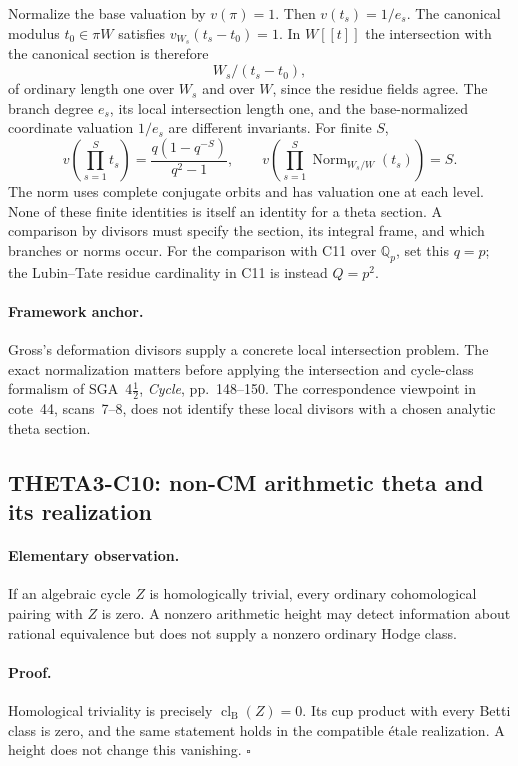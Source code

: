 \documentclass[11pt]{article}
\newcommand{\Q}{\mathbb Q}\newcommand{\C}{\mathbb C}\newcommand{\Z}{\mathbb Z}\newcommand{\R}{\mathbb R}\newcommand{\A}{\mathbb A}\newcommand{\OO}{\mathcal O}
\theoremstyle{definition}\newtheorem{definition}[theorem]{Definition}\newtheorem{remark}[theorem]{Remark}
\begin{document}
Normalize the base valuation by $v(\pi)=1$. Then
$v(t_s)=1/e_s$. The canonical modulus $t_0\in\pi W$ satisfies
$v_{W_s}(t_s-t_0)=1$. In $W[[t]]$ the intersection with the canonical
section is therefore
\[
 W_s/(t_s-t_0),
\]
of ordinary length one over $W_s$ and over $W$, since the residue
fields agree. The branch degree $e_s$, its local intersection
length one, and the base-normalized coordinate valuation $1/e_s$
are different invariants. For finite $S$,
\[
 v\left(\prod_{s=1}^St_s\right)
 =\frac{q(1-q^{-S})}{q^2-1},\qquad
 v\left(\prod_{s=1}^S
             \operatorname{Norm}_{W_s/W}(t_s)\right)=S.
\]
The norm uses complete conjugate orbits and has valuation one at
each level. None of these finite identities is itself an identity
for a theta section. A comparison by divisors must specify the
section, its integral frame, and which branches or norms occur.
For the comparison with C11 over $\Q_p$, set this $q=p$; the
Lubin--Tate residue cardinality in C11 is instead $Q=p^2$.

\paragraph{Framework anchor.}
Gross's deformation divisors supply a concrete local intersection problem.
The exact normalization matters before applying the intersection and
cycle-class formalism of SGA~4$\frac12$, \emph{Cycle}, pp.~148--150.
The correspondence viewpoint in cote~44, scans~7--8, does not identify
these local divisors with a chosen analytic theta section.

\subsection{THETA3-C10: non-CM arithmetic theta and its realization}\label{C10}

\paragraph{Elementary observation.}
If an algebraic cycle $Z$ is homologically trivial, every ordinary
cohomological pairing with $Z$ is zero. A nonzero arithmetic height
may detect information about rational equivalence but does not
supply a nonzero ordinary Hodge class.

\paragraph{Proof.}
Homological triviality is precisely
$\operatorname{cl}_{\mathrm B}(Z)=0$. Its cup product with every
Betti class is zero, and the same statement holds in the compatible
\'etale realization. A height does not change this vanishing.
$\square$
\end{document}
